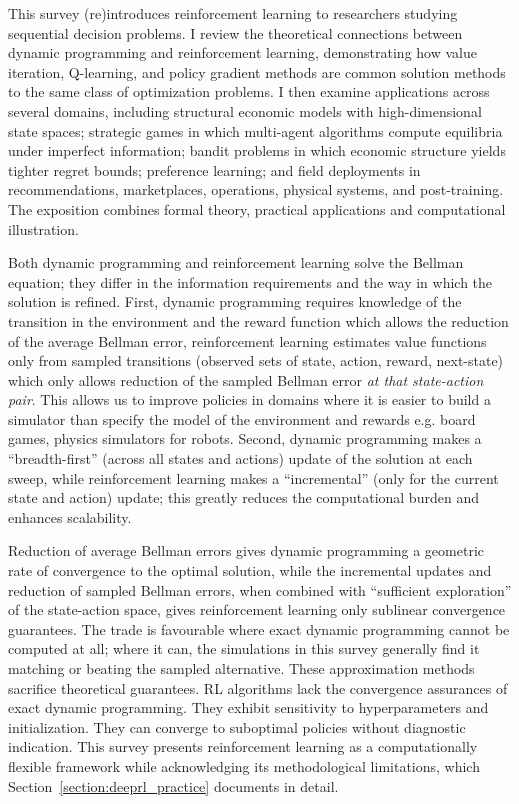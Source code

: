 This survey (re)introduces reinforcement learning to researchers studying sequential decision problems. I review the theoretical connections between dynamic programming and reinforcement learning, demonstrating how value iteration, Q-learning, and policy gradient methods are common solution methods to the same class of optimization problems. I then examine applications across several domains, including structural economic models with high-dimensional state spaces; strategic games in which multi-agent algorithms compute equilibria under imperfect information; bandit problems in which economic structure yields tighter regret bounds; preference learning; and field deployments in recommendations, marketplaces, operations, physical systems, and post-training. The exposition combines formal theory, practical applications and computational illustration.

Both dynamic programming and reinforcement learning solve the Bellman equation; they differ in the information requirements and the way in which the solution is refined. First, dynamic programming requires knowledge of the transition in the environment and the reward function which allows the reduction of the average Bellman error, reinforcement learning estimates value functions only from sampled transitions (observed sets of state, action, reward, next-state) which only allows reduction of the sampled Bellman error \textit{at that state-action pair}. This allows us to improve policies in domains where it is easier to build a simulator than specify the model of the environment and rewards e.g. board games, physics simulators for robots. Second, dynamic programming makes a ``breadth-first'' (across all states and actions) update of the solution at each sweep, while reinforcement learning makes a ``incremental'' (only for the current state and action) update; this greatly reduces the computational burden and enhances scalability.

Reduction of average Bellman errors gives dynamic programming a geometric rate of convergence to the optimal solution, while the incremental updates and reduction of sampled Bellman errors, when combined with ``sufficient exploration'' of the state-action space, gives reinforcement learning only sublinear convergence guarantees. The trade is favourable where exact dynamic programming cannot be computed at all; where it can, the simulations in this survey generally find it matching or beating the sampled alternative. These approximation methods sacrifice theoretical guarantees. RL algorithms lack the convergence assurances of exact dynamic programming. They exhibit sensitivity to hyperparameters and initialization. They can converge to suboptimal policies without diagnostic indication. This survey presents reinforcement learning as a computationally flexible framework while acknowledging its methodological limitations, which Section~\ref{section:deeprl_practice} documents in detail.

